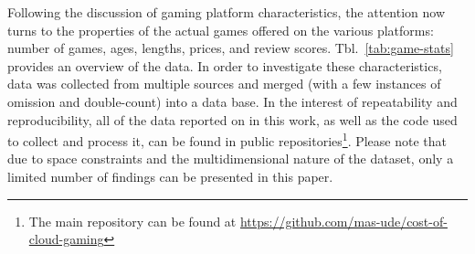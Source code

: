 Following the discussion of gaming platform characteristics, the
attention now turns to the properties of the actual games offered on the
various platforms: number of games, ages, lengths, prices, and review
scores. Tbl.~\ref{tab:game-stats} provides an overview of the data.
In order to investigate these characteristics, data was collected from
multiple sources and merged (with a few instances of omission and
double-count) into a data base. In the interest of repeatability and
reproducibility, all of the data reported on in this work, as well as
the code used to collect and process it, can be found in public
repositories\footnote{The main repository can be found at
\url{https://github.com/mas-ude/cost-of-cloud-gaming}}. Please note that
due to space constraints and the multidimensional nature of the dataset,
only a limited number of findings can be presented in this paper.



% 
% 


